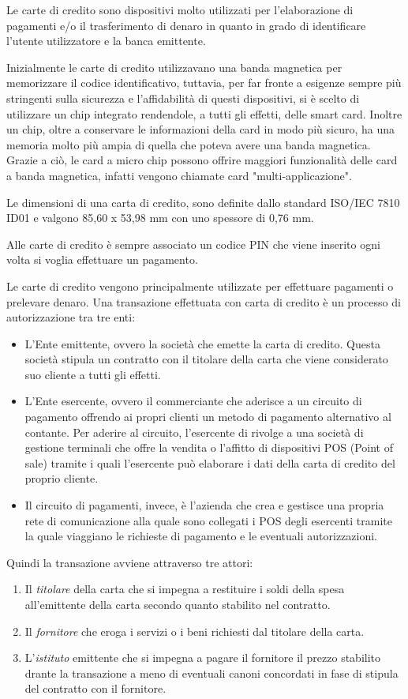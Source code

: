 Le carte di credito sono dispositivi molto utilizzati per l'elaborazione di pagamenti e/o il trasferimento di denaro in quanto in grado di identificare l'utente utilizzatore e la banca emittente.

Inizialmente le carte di credito utilizzavano una banda magnetica per memorizzare il codice identificativo, tuttavia, per far fronte a esigenze sempre più stringenti sulla sicurezza e l'affidabilità di questi dispositivi, si è scelto di utilizzare un chip integrato rendendole, a tutti gli effetti, delle smart card. Inoltre un chip, oltre a conservare le informazioni della card in modo più sicuro, ha una memoria molto più ampia di quella che poteva avere una banda magnetica. Grazie a ciò, le card a micro chip possono offrire maggiori funzionalità delle card a banda magnetica, infatti vengono chiamate card "multi-applicazione".

Le dimensioni di una carta di credito, sono definite dallo standard ISO/IEC 7810 ID01 e valgono 85,60 x 53,98 mm con uno spessore di 0,76 mm.

Alle carte di credito è sempre associato un codice PIN che viene inserito ogni volta si voglia effettuare un pagamento.

Le carte di credito vengono principalmente utilizzate per effettuare pagamenti o prelevare denaro. Una transazione effettuata con carta di credito è un processo di autorizzazione tra tre enti:
\begin{itemize}
    \item L'Ente emittente, ovvero la società che emette la carta di credito. Questa società stipula un contratto con il titolare della carta che viene considerato suo cliente a tutti gli effetti.
    \item L'Ente esercente, ovvero il commerciante che aderisce a un circuito di pagamento offrendo ai propri clienti un metodo di pagamento alternativo al contante. Per aderire al circuito, l'esercente di rivolge a una società di gestione terminali che offre la vendita o l'affitto di dispositivi POS (Point of sale) tramite i quali l'esercente può elaborare i dati della carta di credito del proprio cliente.
    \item Il circuito di pagamenti, invece, è l'azienda che crea e gestisce una propria rete di comunicazione alla quale sono collegati i POS degli esercenti tramite la quale viaggiano le richieste di pagamento e le eventuali autorizzazioni.
\end{itemize}
Quindi la transazione avviene attraverso tre attori:
\begin{enumerate}
    \item Il \textit{titolare} della carta che si impegna a restituire i soldi della spesa all'emittente della carta secondo quanto stabilito nel contratto.
    \item Il \textit{fornitore} che eroga i servizi o i beni richiesti dal titolare della carta.
    \item L'\textit{istituto} emittente che si impegna a pagare il fornitore il prezzo stabilito drante la transazione a meno di eventuali canoni concordati in fase di stipula del contratto con il fornitore.
\end{enumerate}

